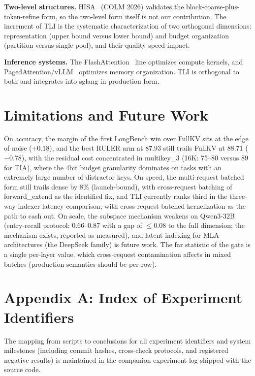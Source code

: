 \documentclass[11pt]{article}
\begin{document}
\textbf{Two-level structures.} HISA~\cite{hisa} (COLM 2026) validates the block-coarse-plus-token-refine form, so the two-level form itself is not our contribution. The increment of TLI is the systematic characterization of two orthogonal dimensions: representation (upper bound versus lower bound) and budget organization (partition versus single pool), and their quality-speed impact.

\textbf{Inference systems.} The FlashAttention~\cite{fa} line optimizes compute kernels, and PagedAttention/vLLM~\cite{vllm} optimizes memory organization. TLI is orthogonal to both and integrates into sglang in production form.

\section{Limitations and Future Work}

On accuracy, the margin of the first LongBench win over FullKV sits at the edge of noise (+0.18), and the best RULER arm at 87.93 still trails FullKV at 88.71 ($-0.78$), with the residual cost concentrated in multikey\_3 (16K: 75--80 versus 89 for TIA), where the 4bit budget granularity dominates on tasks with an extremely large number of distractor keys. On speed, the multi-request batched form still trails dense by 8\% (launch-bound), with cross-request batching of forward\_extend as the identified fix, and TLI currently ranks third in the three-way indexer latency comparison, with cross-request batched kernelization as the path to cash out. On scale, the subspace mechanism weakens on Qwen3-32B (entry-recall protocol: 0.66--0.87 with a gap of $\leq$0.08 to the full dimension; the mechanism exists, reported as measured), and latent indexing for MLA architectures (the DeepSeek family) is future work. The far statistic of the gate is a single per-layer value, which cross-request contamination affects in mixed batches (production semantics should be per-row).

\section*{Appendix A: Index of Experiment Identifiers}
The mapping from scripts to conclusions for all experiment identifiers and system milestones (including commit hashes, cross-check protocols, and registered negative results) is maintained in the companion experiment log shipped with the source code.
\end{document}
